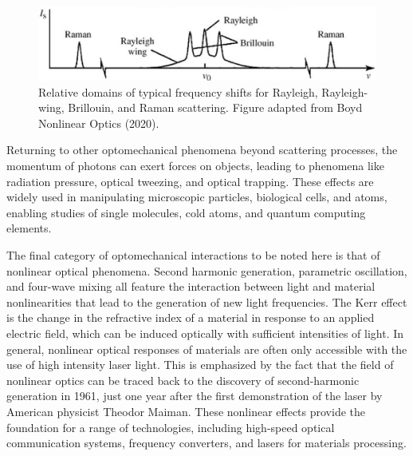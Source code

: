 
\begin{figure}[t] %
\centering
\includegraphics[width=\textwidth]{figs/1-Intro/Boyd scattering frequency shift domains.png}
\caption{Relative domains of typical frequency shifts for Rayleigh, Rayleigh-wing, Brillouin, and Raman scattering. Figure adapted from Boyd Nonlinear Optics (2020). \cite{boyd2020nonlinear}}
\label{fig:Introduction:scattering-domains}
\end{figure}

Returning to other optomechanical phenomena beyond scattering processes, the momentum of photons can exert forces on objects, leading to phenomena like radiation pressure, optical tweezing, and optical trapping. These effects are widely used in manipulating microscopic particles\cite{}, biological cells\cite{}, and atoms\cite{}, enabling studies of single molecules\cite{}, cold atoms\cite{}, and quantum computing elements\cite{}.

The final category of optomechanical interactions to be noted here is that of nonlinear optical phenomena. Second harmonic generation, parametric oscillation, and four-wave mixing all feature the interaction between light and material nonlinearities that lead to the generation of new light frequencies.\cite{boyd2020nonlinear} The Kerr effect is the change in the refractive index of a material in response to an applied electric field, which can be induced optically with sufficient intensities of light. In general, nonlinear optical responses of materials are often only accessible with the use of high intensity laser light. This is emphasized by the fact that the field of nonlinear optics can be traced back to the discovery of second-harmonic generation in 1961\cite{franken1961generation}, just one year after the first demonstration of the laser by American physicist Theodor Maiman.\cite{maiman1960stimulated} These nonlinear effects provide the foundation for a range of technologies, including high-speed optical communication systems\cite{}, frequency converters\cite{}, and lasers for materials processing\cite{}.

